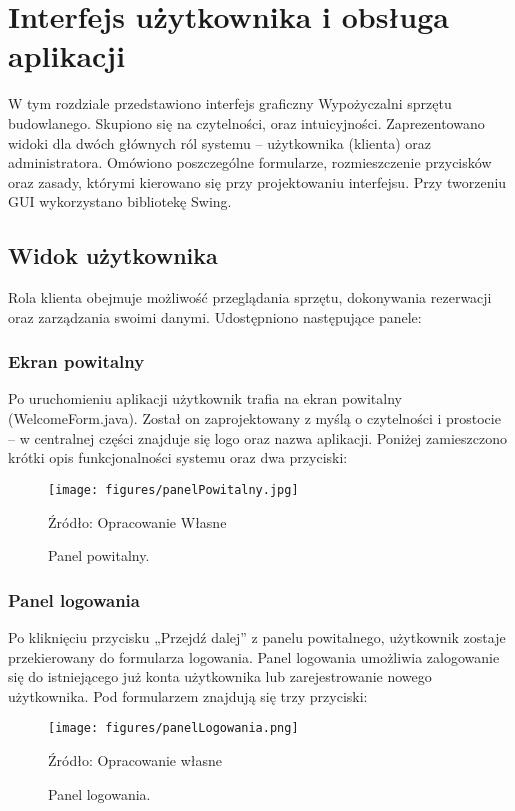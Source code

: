\chapter{Interfejs użytkownika i obsługa aplikacji}
\label{cha:InterfejsUzytkownika}

W tym rozdziale przedstawiono interfejs graficzny Wypożyczalni sprzętu budowlanego. Skupiono się na czytelności, oraz intuicyjności. Zaprezentowano widoki dla dwóch głównych ról systemu – użytkownika (klienta) oraz administratora. Omówiono poszczególne formularze, rozmieszczenie przycisków oraz zasady, którymi kierowano się przy projektowaniu interfejsu. Przy tworzeniu GUI wykorzystano bibliotekę Swing.

\section{Widok użytkownika}

Rola klienta obejmuje możliwość przeglądania sprzętu, dokonywania rezerwacji oraz zarządzania swoimi danymi. Udostępniono następujące panele:
\subsection{Ekran powitalny}

Po uruchomieniu aplikacji użytkownik trafia na ekran powitalny (WelcomeForm.java). Został on zaprojektowany z myślą o czytelności i prostocie – w centralnej części znajduje się logo oraz nazwa aplikacji. Poniżej zamieszczono krótki opis funkcjonalności systemu oraz dwa przyciski:

\begin{figure}[H]
    \centering
    \texttt{[image: figures/panelPowitalny.jpg]}
    \caption{Panel powitalny.}
    \label{fig:panelPowitalny}
    \small{Źródło: Opracowanie Własne}
\end{figure}
\clearpage




\subsection{Panel logowania}
Po kliknięciu przycisku „Przejdź dalej” z panelu powitalnego, użytkownik zostaje przekierowany do formularza logowania. Panel logowania umożliwia zalogowanie się do istniejącego już konta użytkownika lub zarejestrowanie nowego użytkownika. Pod formularzem znajdują się trzy przyciski:
\vspace{-0.2cm}
\begin{figure}[!htbp]
    \centering
    \texttt{[image: figures/panelLogowania.png]}
    \caption{Panel logowania.}
    \label{fig:panelLogowania}
    \small{Źródło: Opracowanie własne}
\end{figure}


